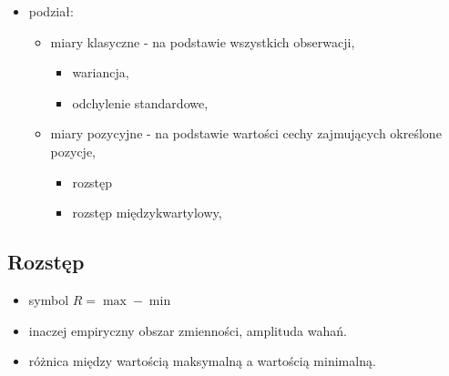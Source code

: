 \documentclass[
  polish,
  letterpaper,
  DIV=11,
  numbers=noendperiod]{scrreprt}
\providecommand{\tightlist}{%
  \setlength{\itemsep}{0pt}\setlength{\parskip}{0pt}}
\begin{document}
\begin{itemize}
\tightlist
\item
  podział:

  \begin{itemize}
  \tightlist
  \item
    miary klasyczne - na podstawie wszystkich obserwacji,

    \begin{itemize}
    \tightlist
    \item
      wariancja,
    \item
      odchylenie standardowe,
    \end{itemize}
  \item
    miary pozycyjne - na podstawie wartości cechy zajmujących określone
    pozycje,

    \begin{itemize}
    \tightlist
    \item
      rozstęp
    \item
      rozstęp międzykwartylowy,
    \end{itemize}
  \end{itemize}
\end{itemize}

\subsection{Rozstęp}\label{rozstux119p}

\begin{itemize}
\tightlist
\item
  symbol \(R=\max-\min\)
\item
  inaczej empiryczny obszar zmienności, amplituda wahań.
\item
  różnica między wartością maksymalną a wartością minimalną.
\end{itemize}
\end{document}
